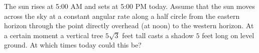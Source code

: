 The sun rises at 5:00 AM and sets at 5:00 PM today. Assume that the sun moves across the sky at a constant angular rate along a half circle from the eastern horizon through the point directly overhead (at noon) to the western horizon. At a certain moment a vertical tree $5\sqrt{3}$ feet tall casts a shadow $5$ feet long on level ground. At which times today could this be?
